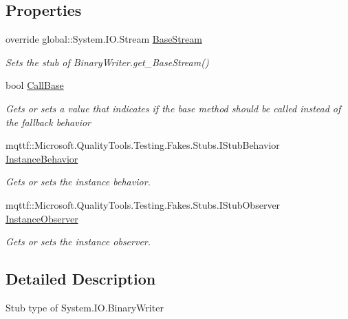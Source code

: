 \subsection*{Properties}
\begin{DoxyCompactItemize}
\item 
override global\-::\-System.\-I\-O.\-Stream \hyperlink{class_system_1_1_i_o_1_1_fakes_1_1_stub_binary_writer_abe144550f09e0c2b8dce7255ff717a4c}{Base\-Stream}
\begin{DoxyCompactList}\small\item\em Sets the stub of Binary\-Writer.\-get\-\_\-\-Base\-Stream()\end{DoxyCompactList}\item 
bool \hyperlink{class_system_1_1_i_o_1_1_fakes_1_1_stub_binary_writer_ab41f085bb0cc22db549ad7f7a57e4fc5}{Call\-Base}
\begin{DoxyCompactList}\small\item\em Gets or sets a value that indicates if the base method should be called instead of the fallback behavior\end{DoxyCompactList}\item 
mqttf\-::\-Microsoft.\-Quality\-Tools.\-Testing.\-Fakes.\-Stubs.\-I\-Stub\-Behavior \hyperlink{class_system_1_1_i_o_1_1_fakes_1_1_stub_binary_writer_afe2016419ac7478a7559fac00426b2dc}{Instance\-Behavior}
\begin{DoxyCompactList}\small\item\em Gets or sets the instance behavior.\end{DoxyCompactList}\item 
mqttf\-::\-Microsoft.\-Quality\-Tools.\-Testing.\-Fakes.\-Stubs.\-I\-Stub\-Observer \hyperlink{class_system_1_1_i_o_1_1_fakes_1_1_stub_binary_writer_a14b7748acc169c8ca017374ce52e98ff}{Instance\-Observer}
\begin{DoxyCompactList}\small\item\em Gets or sets the instance observer.\end{DoxyCompactList}\end{DoxyCompactItemize}


\subsection{Detailed Description}
Stub type of System.\-I\-O.\-Binary\-Writer




